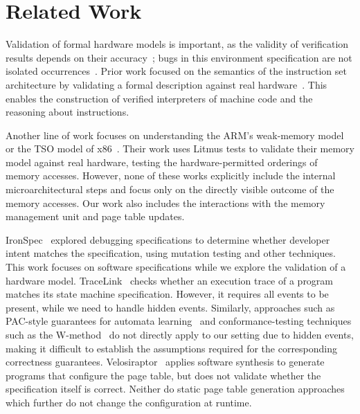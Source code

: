 \section{Related Work}\label{sec:related}

Validation of formal hardware models is important, as the validity of verification results depends on their accuracy~\cite{reid2016trustworthy,armstrong2019sail,reid2016isaf}; bugs in this environment specification are not isolated occurrences~\cite{Fonseca:2017:EnvironmentBugs}.
Prior work focused on the semantics of the instruction set architecture by validating a formal description against real hardware~\cite{reid2016trustworthy,reid2016isaf, armstrong2019sail}. This enables the construction of verified interpreters of machine code and the reasoning about instructions.

Another line of work focuses on understanding the ARM's weak-memory model~\cite{alglave2011litmus,alglave2014herding} or the TSO model of x86~\cite{owens2009x86tso,sewell2010x86tso}. 
Their work uses Litmus tests to validate their memory model against real hardware, testing the hardware-permitted orderings of memory accesses.
However, none of these works explicitly include the internal microarchitectural steps and focus only on the directly visible outcome of the memory accesses. Our work also includes the interactions with the memory management unit and page table updates.

IronSpec~\cite{goldweber2024ironspec} explored debugging specifications to determine whether developer intent matches the specification, using mutation testing and other techniques. This work focuses on software specifications while we explore the validation of a hardware model. 
TraceLink~\cite{Hackett:2025:Tracelink} checks whether an execution trace of a program matches its state machine specification. However, it requires all events to be present, while we need to handle hidden events. Similarly, approaches such as PAC-style guarantees for automata learning~\cite{Valiant:1984:PAC} and conformance-testing techniques such as the W-method~\cite{Chow:1978:WMethod} do not directly apply to our setting due to hidden events, making it difficult to establish the assumptions required for the corresponding correctness guarantees.
Velosiraptor~\cite{Achermann:2025:Velosiraptor} applies software synthesis to generate programs that configure the page table, but does not validate whether the specification itself is correct. Neither do static page table generation approaches~\cite{Achermann:2021:GenPT} which further do not change the configuration at runtime.